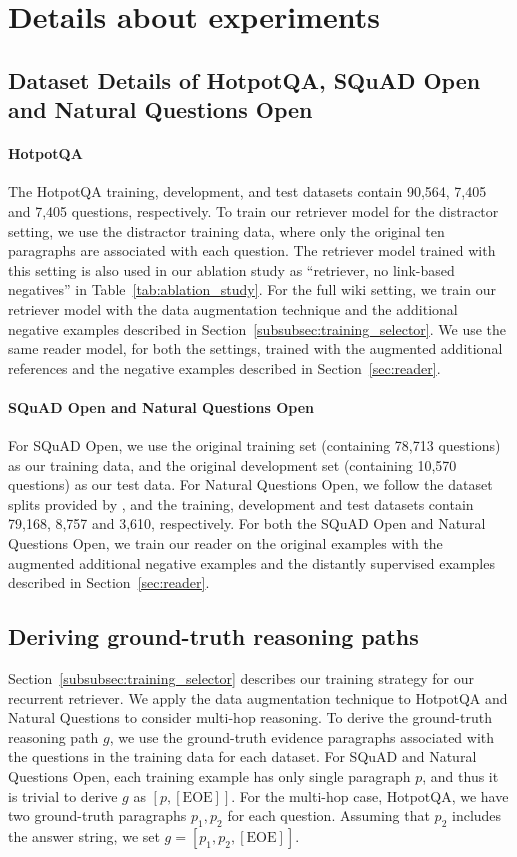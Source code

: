 \section{Details about experiments}
\label{sec:appendix_experimental_details}

\subsection{Dataset Details of HotpotQA, SQuAD Open and Natural Questions Open}

\paragraph{HotpotQA}
The HotpotQA training, development, and test datasets contain 90,564, 7,405 and 7,405 questions, respectively.
To train our retriever model for the distractor setting, we use the distractor training data, where only the original ten paragraphs are associated with each question.
The retriever model trained with this setting is also used in our ablation study as ``retriever, no link-based negatives'' in Table~\ref{tab:ablation_study}.
For the full wiki setting, we train our retriever model with the data augmentation technique and the additional negative examples described in Section~\ref{subsubsec:training_selector}.
We use the same reader model, for both the settings, trained with the augmented additional references and the negative examples described in Section~\ref{sec:reader}.

\paragraph{SQuAD Open and Natural Questions Open}
For SQuAD Open, we use the original training set (containing 78,713 questions) as our training data, and the original development set (containing 10,570 questions) as our test data.
For Natural Questions Open, we follow the dataset splits provided by \cite{min2019discrete}, and the training, development and test datasets contain 79,168, 8,757 and 3,610, respectively.
For both the SQuAD Open and Natural Questions Open, we train our reader on the original examples with the augmented additional negative examples and the distantly supervised examples described in Section~\ref{sec:reader}.

\subsection{Deriving ground-truth reasoning paths}
Section~\ref{subsubsec:training_selector} describes our training strategy for our recurrent retriever.
We apply the data augmentation technique to HotpotQA and Natural Questions to consider multi-hop reasoning.
To derive the ground-truth reasoning path $g$, we use the ground-truth evidence paragraphs associated with the questions in the training data for each dataset.
For SQuAD and Natural Questions Open, each training example has only single paragraph $p$, and thus it is trivial to derive $g$ as $[p, [\mathrm{EOE}]]$.
For the multi-hop case, HotpotQA, we have two ground-truth paragraphs $p_1, p_2$ for each question.
Assuming that $p_2$ includes the answer string, we set $g=[p_1, p_2, [\mathrm{EOE}]]$.

